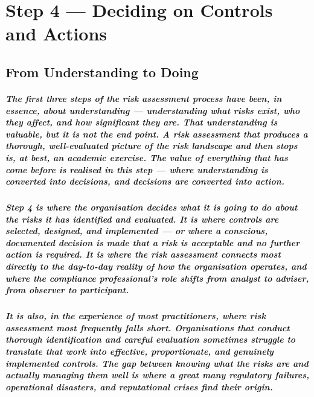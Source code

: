 \chapter{Step 4 — Deciding on Controls and Actions}
\label{chap:Step 4 — Deciding on Controls and Actions}

\section{From Understanding to Doing}
\paragraph{The first three steps of the risk assessment process have been, in essence, about understanding — understanding what risks exist, who they affect, and how significant they are. That understanding is valuable, but it is not the end point. A risk assessment that produces a thorough, well-evaluated picture of the risk landscape and then stops is, at best, an academic exercise. The value of everything that has come before is realised in this step — where understanding is converted into decisions, and decisions are converted into action.}
\paragraph{Step 4 is where the organisation decides what it is going to do about the risks it has identified and evaluated. It is where controls are selected, designed, and implemented — or where a conscious, documented decision is made that a risk is acceptable and no further action is required. It is where the risk assessment connects most directly to the day-to-day reality of how the organisation operates, and where the compliance professional's role shifts from analyst to adviser, from observer to participant.}
\paragraph{It is also, in the experience of most practitioners, where risk assessment most frequently falls short. Organisations that conduct thorough identification and careful evaluation sometimes struggle to translate that work into effective, proportionate, and genuinely implemented controls. The gap between knowing what the risks are and actually managing them well is where a great many regulatory failures, operational disasters, and reputational crises find their origin.}
